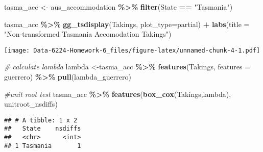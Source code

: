 \documentclass[
]{article}
\newenvironment{Shaded}{\begin{snugshade}}{\end{snugshade}}
\newcommand{\AttributeTok}[1]{\textcolor[rgb]{0.13,0.29,0.53}{#1}}
\newcommand{\CommentTok}[1]{\textcolor[rgb]{0.56,0.35,0.01}{\textit{#1}}}
\newcommand{\DecValTok}[1]{\textcolor[rgb]{0.00,0.00,0.81}{#1}}
\newcommand{\FunctionTok}[1]{\textcolor[rgb]{0.13,0.29,0.53}{\textbf{#1}}}
\newcommand{\NormalTok}[1]{#1}
\newcommand{\OtherTok}[1]{\textcolor[rgb]{0.56,0.35,0.01}{#1}}
\newcommand{\SpecialCharTok}[1]{\textcolor[rgb]{0.81,0.36,0.00}{\textbf{#1}}}
\newcommand{\StringTok}[1]{\textcolor[rgb]{0.31,0.60,0.02}{#1}}
\begin{document}
\begin{Shaded}
\begin{Highlighting}[]
\NormalTok{tasma\_acc }\OtherTok{\textless{}{-}} 
\NormalTok{  aus\_accommodation }\SpecialCharTok{\%\textgreater{}\%}
  \FunctionTok{filter}\NormalTok{(State }\SpecialCharTok{==} \StringTok{"Tasmania"}\NormalTok{)}


\NormalTok{tasma\_acc }\SpecialCharTok{\%\textgreater{}\%}
  \FunctionTok{gg\_tsdisplay}\NormalTok{(Takings, }\AttributeTok{plot\_type=}\StringTok{\textquotesingle{}partial\textquotesingle{}}\NormalTok{) }\SpecialCharTok{+}
  \FunctionTok{labs}\NormalTok{(}\AttributeTok{title =} \StringTok{"Non{-}transformed Tasmania Accomodation Takings"}\NormalTok{)}
\end{Highlighting}
\end{Shaded}

\texttt{[image: Data-6224-Homework-6\_files/figure-latex/unnamed-chunk-4-1.pdf]}

\begin{Shaded}
\begin{Highlighting}[]
\CommentTok{\# calculate lambda}
\NormalTok{lambda }\OtherTok{\textless{}{-}}\NormalTok{tasma\_acc }\SpecialCharTok{\%\textgreater{}\%}
  \FunctionTok{features}\NormalTok{(Takings, }\AttributeTok{features =}\NormalTok{ guerrero) }\SpecialCharTok{\%\textgreater{}\%}
  \FunctionTok{pull}\NormalTok{(lambda\_guerrero)}

\CommentTok{\#unit root test}
\NormalTok{tasma\_acc }\SpecialCharTok{\%\textgreater{}\%}
  \FunctionTok{features}\NormalTok{(}\FunctionTok{box\_cox}\NormalTok{(Takings,lambda), unitroot\_nsdiffs)}
\end{Highlighting}
\end{Shaded}

\begin{verbatim}
## # A tibble: 1 x 2
##   State    nsdiffs
##   <chr>      <int>
## 1 Tasmania       1
\end{verbatim}

\begin{Shaded}
\end{Shaded}
\end{document}
